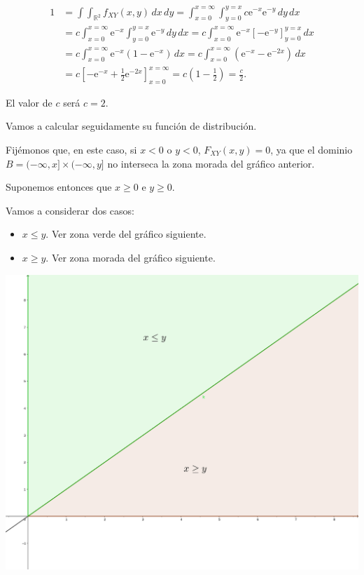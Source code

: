 \documentclass[]{book}
\begin{document}
\[
\begin{array}{rl}
1 &=  \int\int_{\mathbb{R}^2}f_{XY}(x,y)\, dx\, dy=\int_{x=0}^{x=\infty}\int_{y=0}^{y=x} c \mathrm{e}^{-x}\mathrm{e}^{-y} \, dy\, dx \\
  &=  c \int_{x=0}^{x=\infty}\mathrm{e}^{-x}\int_{y=0}^{y=x}\mathrm{e}^{-y}\, dy\, dx = c    \int_{x=0}^{x=\infty}\mathrm{e}^{-x}\left[-\mathrm{e}^{-y}\right]_{y=0}^{y=x}\, dx \\
  &=  c \int_{x=0}^{x=\infty}\mathrm{e}^{-x}\left(1-\mathrm{e}^{-x}\right)\, dx =c \int_{x=0}^{x=\infty}\left(\mathrm{e}^{-x}-\mathrm{e}^{-2x}\right)\, dx 
  \\ & =  c \left[-\mathrm{e}^{-x}+\frac{1}{2}\mathrm{e}^{-2x}\right]_{x=0}^{x=\infty} = c\left(1-\frac{1}{2}\right)=\frac{c}{2}.
\end{array}
\]

El valor de \(c\) será \(c=2\).

Vamos a calcular seguidamente su función de distribución.

Fijémonos que, en este caso, si \(x<0\) o \(y<0\), \(F_{XY}(x,y)=0\), ya que el dominio \(B=(-\infty,x]\times (-\infty,y]\) no interseca la zona morada del gráfico anterior.

Suponemos entonces que \(x\geq 0\) e \(y\geq 0\).

Vamos a considerar dos casos:

\begin{itemize}
\item
  \(x\leq y\). Ver zona verde del gráfico siguiente.
\item
  \(x\geq y\). Ver zona morada del gráfico siguiente.
\end{itemize}

\includegraphics{Images/Ejemplo2Bidi2.png}
\end{document}
